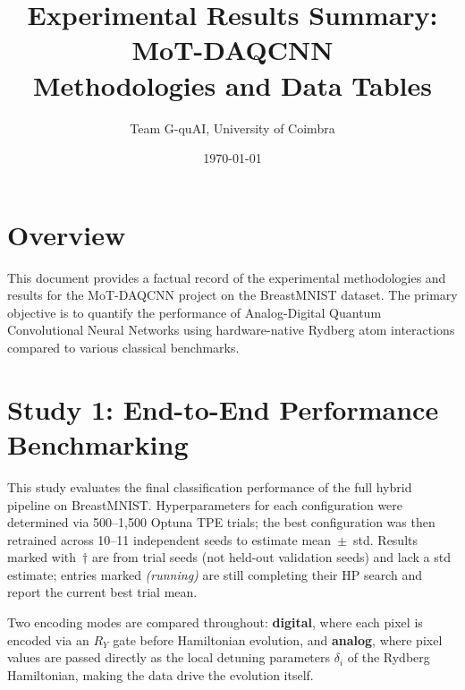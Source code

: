 \documentclass[11pt,a4paper]{article}
\title{Experimental Results Summary: MoT-DAQCNN \\ \large Methodologies and Data Tables}
\author{Team G-quAI, University of Coimbra}
\date{\today}
\begin{document}
\maketitle

\section{Overview}
This document provides a factual record of the experimental methodologies and results for the MoT-DAQCNN project on the BreastMNIST dataset. The primary objective is to quantify the performance of Analog-Digital Quantum Convolutional Neural Networks using hardware-native Rydberg atom interactions compared to various classical benchmarks.

\section{Study 1: End-to-End Performance Benchmarking}
This study evaluates the final classification performance of the full hybrid pipeline on BreastMNIST. Hyperparameters for each configuration were determined via 500--1,500 Optuna TPE trials; the best configuration was then retrained across 10--11 independent seeds to estimate mean~$\pm$~std. Results marked with~$\dagger$ are from trial seeds (not held-out validation seeds) and lack a std estimate; entries marked \emph{(running)} are still completing their HP search and report the current best trial mean.

Two encoding modes are compared throughout: \textbf{digital}, where each pixel is encoded via an $R_Y$ gate before Hamiltonian evolution, and \textbf{analog}, where pixel values are passed directly as the local detuning parameters $\delta_i$ of the Rydberg Hamiltonian, making the data drive the evolution itself.
\end{document}
